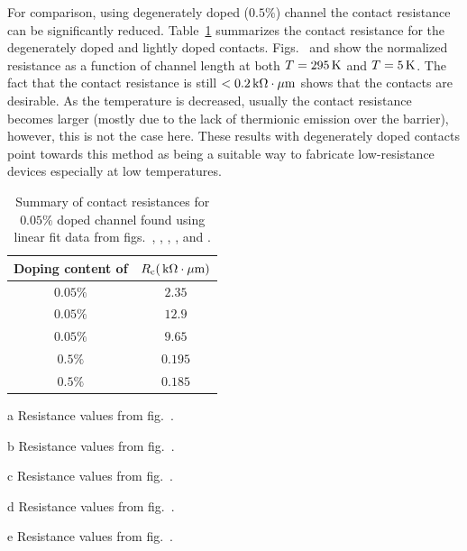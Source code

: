 \noindent For comparison, using degenerately  doped ($0.5\%$)  channel the contact resistance can be significantly reduced. Table~\ref{table:contact_summary} summarizes the contact resistance for the degenerately doped and lightly doped contacts. Figs.~ and  show the normalized resistance as a function of channel length at both $T=295\,\mathrm{K}$ and $T=5\,\mathrm{K}$. The fact that the contact resistance is still $<0.2\,\mathrm{k\Omega\cdot\mu m}$ shows that the contacts are desirable. As the temperature is decreased, usually the contact resistance becomes larger (mostly due to the lack of thermionic emission over the barrier), however, this is not the case here. These results with degenerately doped contacts point towards this method as being a suitable way to fabricate low-resistance devices especially at low temperatures. 
\begin{table}[ht]
	\centering
	\begin{threeparttable}
		\begin{tabular}{c c}
			\hline\hline
			Doping content of \ch{Nb} & $R_\mathrm{c}(\,\mathrm{k\Omega\cdot\mu m})$ \\ [0.5ex]
			\hline
			$0.05\%$ & $2.35$\tnote{a}\\
			$0.05\%$ & $12.9$\tnote{b}\\
			$0.05\%$ & $9.65$\tnote{c}\\ 
			$0.5\%$ & $0.195$\tnote{d}\\ 
			$0.5\%$ & $0.185$\tnote{e}\\[1ex]
			\hline
		\end{tabular}
		\begin{tablenotes}
			\item[a] Resistance values from fig.~.
			\item[b] Resistance values from fig.~.
			\item[c] Resistance values from fig.~.
			\item[d] Resistance values from fig.~.
			\item[e] Resistance values from fig.~.
		\end{tablenotes}
	\caption[Summary of contact resistances for $0.05\%$  doped  channel]{Summary of contact resistances for $0.05\%$  doped  channel found using linear fit data from figs.~, , , , and .}
	\label{table:contact_summary}
	\end{threeparttable}
\end{table}

